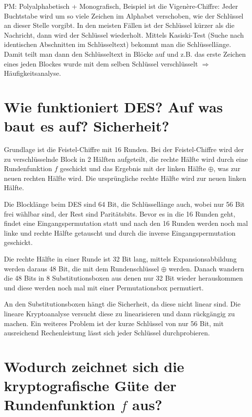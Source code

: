 \documentclass{article}
\begin{document}
	PM: Polyalphabetisch + Monografisch, Beispiel ist die Vigenère-Chiffre: Jeder Buchtstabe wird um so viele Zeichen im Alphabet verschoben, wie der Schlüssel an dieser Stelle vorgibt. In den meisten Fällen ist der Schlüssel kürzer als die Nachricht, dann wird der Schlüssel wiederholt. Mittels Kasiski-Test (Suche nach identischen Abschnitten im Schlüsseltext) bekommt man die Schlüssellänge. Damit teilt man dann den Schlüsseltext in Blöcke auf und z.B. das erste Zeichen eines jeden Blockes wurde mit dem selben Schlüssel verschlüsselt $\Rightarrow$ Häufigkeitsanalyse.
	
	\section*{Wie funktioniert DES? Auf was baut es auf? Sicherheit?}
	
	Grundlage ist die Feistel-Chiffre mit 16 Runden. Bei der Feistel-Chiffre wird der zu verschlüsselnde Block in 2 Hälften aufgeteilt, die rechte Hälfte wird durch eine Rundenfunktion $f$ geschickt und das Ergebnis mit der linken Hälfte $\oplus$, was zur neuen rechten Hälfte wird. Die ursprüngliche rechte Hälfte wird zur neuen linken Hälfte.
	
	Die Blocklänge beim DES sind 64 Bit, die Schlüssellänge auch, wobei nur 56 Bit frei wählbar sind, der Rest sind Paritätsbits. Bevor es in die 16 Runden geht, findet eine Eingangspermutation statt und nach den 16 Runden werden noch mal linke und rechte Hälfte getauscht und durch die inverse Eingangspermutation geschickt.
	
	Die rechte Hälfte in einer Runde ist 32 Bit lang, mittels Expansionsabbildung werden daraus 48 Bit, die mit dem Rundenschlüssel $\oplus$ werden. Danach wandern die 48 Bits in 8 Substitutionsboxen aus denen nur 32 Bit wieder herauskommen und diese werden noch mal mit einer Permutationsbox permutiert.
	
	An den Substitutionsboxen hängt die Sicherheit, da diese nicht linear sind. Die lineare Kryptoanalyse versucht diese zu linearisieren und dann rückgängig zu machen. Ein weiteres Problem ist der kurze Schlüssel von nur 56 Bit, mit ausreichend Rechenleistung lässt sich jeder Schlüssel durchprobieren.
	
	\section*{Wodurch zeichnet sich die kryptografische Güte der Rundenfunktion $f$ aus?}
	
\end{document}
